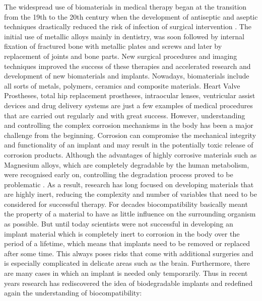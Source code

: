 The widespread use of biomaterials in medical therapy began at the transition from the 19th to the 20th century when the development of antiseptic and aseptic techniques drastically reduced the risk of infection of surgical intervention \supercite{hernigou_history_2017,balamurugan_corrosion_2008,gilbert_medical_2012}. The initial use of metallic alloys mainly in dentistry, was soon followed by internal fixation of fractured bone with metallic plates and screws\supercite{hernigou_history2_2017} and later by replacement of joints and bone parts\supercite{ratner_introduction_1997,fernandez_de_grado_bone_2018}. New surgical procedures and imaging techniques improved the success of these therapies and accelerated research and development of new biomaterials and implants. Nowadays, biomaterials include all sorts of metals, polymers, ceramics and composite materials\supercite{park_biomaterials_2007}. Heart Valve Prostheses, total hip replacement prostheses, intraocular lenses, ventricular assist devices and drug delivery systems are just a few examples of medical procedures that are carried out regularly and with great success\supercite{ratner_introduction_1997,bharadwaj_overview_2021}. However, understanding and controlling the complex corrosion mechanisms in the body has been a major challenge from the beginning. Corrosion can compromise the mechanical integrity and functionality of an implant and may result in the potentially toxic release of corrosion products. Although the advantages of highly corrosive materials such as Magnesium alloys, which are completely degradable by the human metabolism, were recognised early on, controlling the degradation process proved to be problematic \supercite{witte_history_2010}. As a result, research has long focused on developing materials that are highly inert, reducing the complexity and number of variables that need to be considered for successful therapy. For decades biocompatibility basically meant the property of a material to have as little influence on the surrounding organism as possible\supercite{gilbert_medical_2012}. But until today scientists were not successful in developing an implant material which is completely inert to corrosion in the body over the period of a lifetime, which means that implants need to be removed or replaced after some time. This always poses risks that come with additional surgeries and is especially complicated in delicate areas such as the brain. Furthermore, there are many cases in which an implant is needed only temporarily. Thus in recent years research has rediscovered the idea of biodegradable implants and redefined again the understanding of biocompatibility\supercite{ghasemi-mobarakeh_key_2019}: \\
